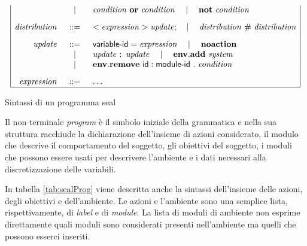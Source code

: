 \begin{table}
$$\begin{array}{|rcl|}
	& \quad\mid\quad & \mathit{condition} \mbox{ } \mathbf{or} \mbox{ } \mathit{condition} \quad\mid\quad \mathbf{not} \mbox{ } \mathit{condition}
	\\[.3cm]
\mathit{distribution} &::=& <\mathit{expression}> \mathit{update}; \quad\mid\quad \mathit{distribution} \mbox{ } \# \mbox{ } \mathit{distribution}
	\\[.3cm]
\mathit{update} &::=& {\sf variable}\textrm{-}{\sf id} = \mathit{expression} \quad\mid\quad \mathbf{noaction} \\
	& \quad\mid\quad & \mathit{update} \mbox{ } ; \mbox{ } \mathit{update} \quad\mid\quad \mathbf{env.add} \mbox{ } \mathit{system} \\
	& \quad\mid\quad & \mathbf{env.remove} \mbox{ } {\sf id}:{\sf module}\textrm{-}{\sf id} \mbox{ } . \mbox{ } \mathit{condition} 
	\\[.3cm]
\mathit{expression} &::=& \dots
	\\
\hline
\end{array}
$$
\label{tab:sealProg} %
\caption{Sintassi di un programma \ac{seal}}
\end{table}

Il non terminale \emph{program} è il simbolo iniziale della grammatica e nella sua struttura racchiude la dichiarazione dell'insieme di azioni considerato, il modulo che descrive il comportamento del soggetto, gli obiettivi del soggetto, i moduli che possono essere usati per descrivere l'ambiente e i dati necessari alla discretizzazione delle variabili.

In tabella \ref{tab:sealProg} viene descritta anche la sintassi dell'insieme delle azioni, degli obiettivi e dell'ambiente. Le azioni e l'ambiente sono una semplice lista, rispettivamente, di \emph{label} e di \emph{module}. La lista di moduli di ambiente non esprime direttamente quali moduli sono considerati presenti nell'ambiente ma quelli che possono esserci inseriti.


